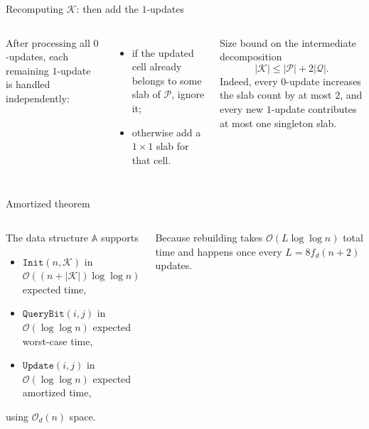 \documentclass[aspectratio=169,professionalfonts]{beamer}
\newcommand{\Oh}{\mathcal{O}}
\newcommand{\fd}{f_d}
\newcommand{\cK}{\mathcal{K}}
\newcommand{\cP}{\mathcal{P}}
\newcommand{\cQ}{\mathcal{Q}}
\newcommand{\bbA}{\mathbb{A}}
\begin{document}
\begin{frame}[t]{Recomputing $\cK$: then add the $1$-updates}
\begin{columns}[T,totalwidth=\textwidth]
After processing all $0$-updates, each remaining $1$-update is handled independently:
\begin{itemize}
\item if the updated cell already belongs to some slab of $\cP$, ignore it;
\item otherwise add a $1\times 1$ slab for that cell.
\end{itemize}
\begin{block}{Size bound on the intermediate decomposition}
\[
|\cK|\le |\cP|+2|\cQ|.
\]
Indeed, every $0$-update increases the slab count by at most $2$, and every new $1$-update contributes at most one singleton slab.
\end{block}
\centering
{}
\end{columns}
\end{frame}

\begin{frame}[t]{Amortized theorem}
\begin{columns}[T,totalwidth=\textwidth]
\begin{theorem}
The data structure $\bbA$ supports
\begin{itemize}
\item $\mathtt{Init}(n,\cK)$ in $\Oh((n+|\cK|)\log\log n)$ expected time,
\item $\mathtt{QueryBit}(i,j)$ in $\Oh(\log\log n)$ expected worst-case time,
\item $\mathtt{Update}(i,j)$ in $\Oh(\log\log n)$ expected amortized time,
\end{itemize}
using $\Oh_d(n)$ space.
\end{theorem}
Because rebuilding takes $\Oh(L\log\log n)$ total time and happens once every $L=8\fd(n+2)$ updates.
\centering
{}
\end{columns}
\end{frame}
\end{document}
